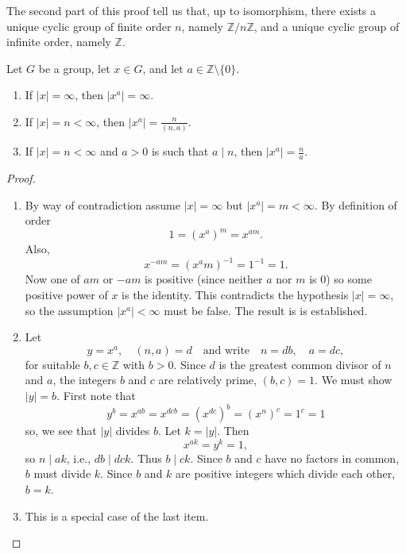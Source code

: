 \documentclass[11pt,a4paper]{article}
\begin{document}
\begin{rem}
    The second part of this proof tell us that, up to isomorphism, there exists a unique cyclic group of finite order \( n \), namely \( \mathbb{Z}/n\mathbb{Z}  \), and a unique cyclic group of infinite order, namely \( \mathbb{Z} \).
\end{rem}


\begin{prop}
    Let \( G \) be a group, let \( x \in G \), and let \( a \in \mathbb{Z}\setminus\{0\} \).
\begin{enumerate}[label=(\roman*)]
    \item If \( |x| = \infty \), then \( |x^a| = \infty \).
    \item If \( |x| = n < \infty \), then \( |x^a| = \frac{n}{(n, a)} \).
    \item If \( |x| = n < \infty \) and   \( a > 0  \) is such that \(a\mid n\), then \( |x^a| = \frac{n}{a} \).
\end{enumerate}
\end{prop}


\begin{proof}
    \begin{enumerate}[label=(\roman*)]
        \item By way of contradiction assume \( |x| = \infty \) but \( |x^a| = m < \infty \). By definition of order
        \[
        1 = (x^a)^m = x^{am}.
        \]
        Also,
        \[
        x^{-am} = (x^am)^{-1} = 1^{-1} = 1.
        \]
        Now one of \( am \) or \( -am \) is positive (since neither \( a \) nor \( m \) is \( 0 \)) so some positive power of \( x \) is the identity. This contradicts the hypothesis \( |x| = \infty \), so the assumption \( |x^a| < \infty \) must be false. The result is is established.
    
        \item Let
        \[
        y = x^a, \quad (n, a) = d \quad \text{and write} \quad n = db, \quad a = dc,
        \]
        for suitable \( b, c \in \mathbb{Z} \) with \( b > 0 \). Since \( d \) is the greatest common divisor of \( n \) and \( a \), the integers \( b \) and \( c \) are relatively prime,
        \(
        (b, c) = 1.
        \)
        We must show \( |y| = b \). First note that
        \[
        y^b = x^{ab} = x^{dcb} = (x^{dc})^b = (x^n)^c = 1^c = 1
        \]
        so,   we see that \( |y| \) divides \( b \). Let \( k = |y| \). Then
        \[
        x^{ak} = y^k = 1,
        \]
        so   \( n \mid ak \), i.e., \( db \mid dck \). Thus \( b \mid ck \). Since \( b \) and \( c \) have no factors in common, \( b \) must divide \( k \). Since \( b \) and \( k \) are positive integers which divide each other, \( b = k \). 
    
        
        \item This is a special case of the last item.
    \end{enumerate}
\end{proof}
\end{document}
